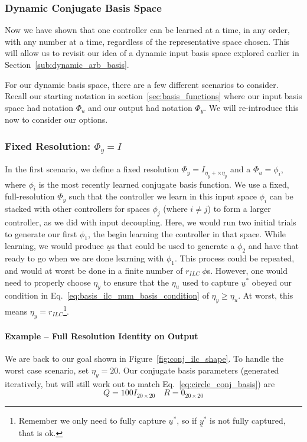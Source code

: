 \FloatBarrier\subsubsection{Dynamic Conjugate Basis Space}
Now we have shown that one controller can be learned at a time, in any order, with any number at a time, regardless of the representative space chosen. This will allow us to revisit our idea of a dynamic input basis space explored earlier in Section~\ref{sub:dynamic_arb_basis}.

For our dynamic basis space, there are a few different scenarios to consider. Recall our starting notation in section~\ref{sec:basis_functions} where our input basis space had notation $\Phi_u$ and our output had notation $\Phi_y$. We will re-introduce this now to consider our options.

\FloatBarrier\subsubsection{Fixed Resolution: $\Phi_y = I$}
In the first scenario, we define a fixed resolution $\Phi_y = I_{\eta_y + \times \eta_y}$ and a $\Phi_u = \phi_i$, where $\phi_i$ is the most recently learned conjugate basis function. 
We use a fixed, full-resolution $\Phi_y$ such that the controller we learn in this input space $\phi_i$ can be stacked with other controllers for spaces $\phi_j$ (where $i \neq j$) to form a larger controller, as we did with input decoupling. 
Here, we would run two initial trials to generate our first $\phi_1$, the begin learning the controller in that space. While learning, we would produce $\underline{u}$s that could be used to generate a $\phi_2$ and have that ready to go when we are done learning with $\phi_1$. 
This process could be repeated, and would at worst be done in a finite number of $r_{ILC} \ \phi$s. However, one would need to properly choose $\eta_y$ to ensure that the $\eta_u$ used to capture $\underline{u}^\ast$ obeyed our condition in Eq.~\ref{eq:basis_ilc_num_basis_condition} of $\eta_y \geq \eta_u$. At worst, this means $\eta_y = r_{ILC}$\footnote{Remember we only need to fully capture $\underline{u}^\ast$, so if $\underline{y}^\ast$ is not fully captured, that is ok.}.

\FloatBarrier\paragraph{Example -- Full Resolution Identity on Output}
We are back to our goal shown in Figure~\ref{fig:conj_ilc_shape}. To handle the worst case scenario, set $\eta_y = 20$. Our conjugate basis parameters (generated iteratively, but will still work out to match Eq.~\ref{eq:circle_conj_basis}) are
\begin{equation}
    Q = 100I_{20 \times 20}
    \quad
    R = 0_{20 \times 20}
\end{equation}


